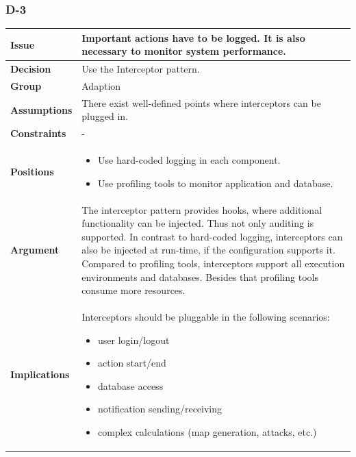 \documentclass[11pt]{article}
\begin{document}
\newpage

\subsubsection{D-3}

\begin{table}[h] \small
	\begin{tabularx}{\textwidth}{ | l | X |}
    	\hline
	\cellcolor[gray]{0.9}
    	\textbf{Issue} & Important actions have to be logged. It is also necessary to monitor system performance. \\
	\hline
	\cellcolor[gray]{0.9}
	\textbf{Decision} & Use the Interceptor pattern. \\
	\hline
	\cellcolor[gray]{0.9}
	\textbf{Group} & Adaption \\
	\hline
	\cellcolor[gray]{0.9}
	\textbf{Assumptions} & There exist well-defined points where interceptors can be plugged in. \\
	\hline
	\cellcolor[gray]{0.9}
	\textbf{Constraints} & - \\
	\hline
	\cellcolor[gray]{0.9}
	\textbf{Positions} &
		\begin{itemize}
		\item Use hard-coded logging in each component.
		\item Use profiling tools to monitor application and database.
		\end{itemize}\\
	\hline
	\cellcolor[gray]{0.9}
	\textbf{Argument} & The interceptor pattern provides hooks, where additional functionality can be injected. Thus not only auditing is supported. In contrast to hard-coded logging, interceptors can also be injected at run-time, if the configuration supports it. Compared to profiling tools, interceptors support all execution environments and databases. Besides that profiling tools consume more resources. \\
	\hline
	\cellcolor[gray]{0.9}
	\textbf{Implications} & Interceptors should be pluggable in the following scenarios:
		\begin{itemize}
		\item user login/logout
		\item action start/end
		\item database access
		\item notification sending/receiving
		\item complex calculations (map generation, attacks, etc.)
		\end{itemize}\\

\end{tabularx}
\end{table}
\end{document}
